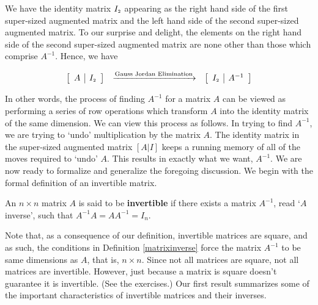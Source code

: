 We have the identity matrix $I_{\mbox{\tiny$2$}}$ appearing as the right hand side of the first super-sized augmented matrix and the left hand side of the second super-sized augmented matrix.  To our surprise and delight, the elements on the right hand side of the second super-sized augmented matrix are none other than those which comprise $A^{-1}$.  Hence, we have

\[ \begin{array}{ccc}

\left[ \begin{array}{c|c} A & I_{\mbox{\tiny$2$}} \end{array} \right]

&
\xrightarrow{\text{Gauss Jordan Elimination}}

&

\left[ \begin{array}{c|c} I_{\mbox{\tiny$2$}} & A^{-1} \end{array} \right] 

\end{array}\]

In other words, the process of finding $A^{-1}$ for a matrix $A$ can be viewed as performing a series of row operations which transform $A$ into the identity matrix of the same dimension.  We can view this process as follows.  In trying to find $A^{-1}$, we are trying to `undo' multiplication by the matrix $A$.  The identity matrix in the  super-sized augmented matrix $[A | I]$ keeps a running memory of all of the moves required to `undo' $A$.  This results in exactly what we want, $A^{-1}$.  We are now ready to formalize and generalize the foregoing discussion.  We begin with the formal definition of an invertible matrix.

\smallskip

\colorbox{ResultColor}{\bbm

\begin{defn}  \label{matrixinverse}  An $n \times n$ matrix $A$ is said to be \textbf{invertible} if there exists a matrix $A^{-1}$, read `$A$ inverse', such that $A^{-1}A = AA^{-1}=I_{n}$. 
\end{defn}
\ebm}


\smallskip

Note that, as a consequence of our definition, invertible matrices are square, and as such, the conditions in Definition \ref{matrixinverse} force the matrix $A^{-1}$ to be same dimensions as $A$, that is, $n \times n$.  Since not all matrices are square, not all matrices are invertible.  However, just because a matrix is square doesn't guarantee it is invertible.  (See the exercises.)   Our first result summarizes some of the important characteristics of invertible matrices and their inverses.  

